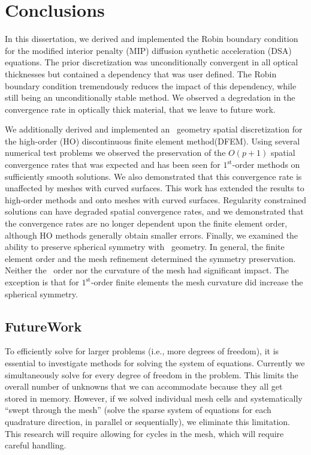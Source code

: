 \documentclass[12pt]{article}
\begin{document}
\section{Conclusions}
\label{sec:Conclusions}

In this dissertation, we derived and implemented the Robin boundary condition for the modified interior penalty (MIP) diffusion synthetic acceleration (DSA) equations. The prior discretization was unconditionally convergent in all optical thicknesses but contained a dependency that was user defined. The Robin boundary condition tremendously reduces the impact of this dependency, while still being an unconditionally stable method. We observed a degredation in the convergence rate in optically thick material, that we leave to future work.

We additionally derived and implemented an \RZ\ geometry spatial discretization for the high-order (HO) discontinuous finite element method(DFEM). Using several numerical test problems we observed the preservation of the $O(p+1)$ spatial convergence rates that was expected and has been seen for $1^\text{st}$-order methods on sufficiently smooth solutions. We also demonstrated that this convergence rate is unaffected by meshes with curved surfaces. This work has extended the results to high-order methods and onto meshes with curved surfaces. Regularity constrained solutions can have degraded spatial convergence rates, and we demonstrated that the convergence rates are no longer dependent upon the finite element order, although HO methods generally obtain smaller errors. Finally, we examined the ability to preserve spherical symmetry with \RZ\ geometry. In general, the finite element order and the mesh refinement determined the symmetry preservation. Neither the \SN\ order nor the curvature of the mesh had significant impact. The exception is that for $1^\text{st}$-order finite elements the mesh curvature did increase the spherical symmetry.

\subsection{FutureWork}
\label{subsec:FutureWork}
To efficiently solve for larger problems (i.e., more degrees of freedom), it is essential to investigate methods for solving the system of equations. Currently we simultaneously solve for every degree of freedom in the problem. This limits the overall number of unknowns that we can accommodate because they all get stored in memory. However, if we solved individual mesh cells and systematically ``swept through the mesh'' (solve the sparse system of equations for each quadrature direction, in parallel or sequentially), we eliminate this limitation. This research will require allowing for cycles in the mesh, which will require careful handling.
\end{document}
